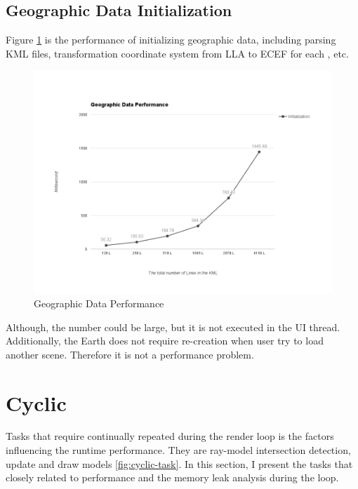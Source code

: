 \subsection{Geographic Data Initialization}

Figure \ref{fig:geographic-data-performance} is the performance of initializing geographic data, including parsing KML files, transformation coordinate system from LLA to ECEF for each , etc.

\begin{figure}[H]
	\caption{Geographic Data Performance}
	\label{fig:geographic-data-performance}
	\centering
	\includegraphics[width=\textwidth, keepaspectratio]{Figures/geographic-data-performance.png}
	\decoRule
\end{figure}

Although, the number could be large, but it is not executed in the UI thread. Additionally, the Earth does not require re-creation when user try to load another scene. Therefore it is not a performance problem.

\section{Cyclic}

Tasks that require continually repeated during the render loop is the factors influencing the runtime performance. They are ray-model intersection detection, update and draw models \ref{fig:cyclic-task}. In this section, I present the tasks that closely related to performance and the memory leak analysis during the loop.
 
